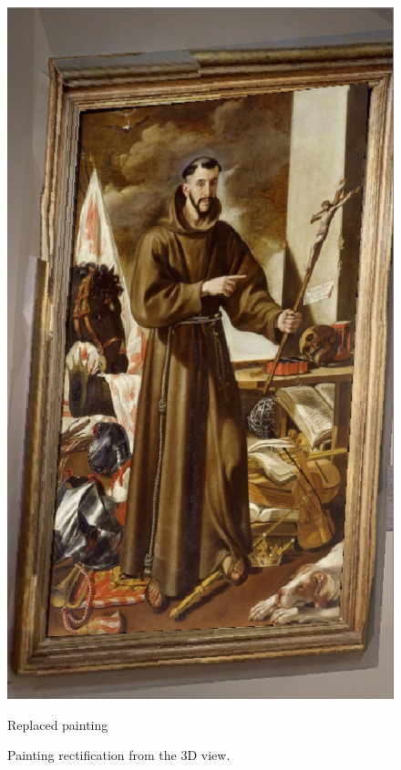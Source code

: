 \begin{figure}[h!]
{{      \includegraphics[width=\linewidth]{pictures/painting_detection/3d_rectification_warped.PNG}
      \caption*{Replaced painting}\label{fig:rectification_warped}
    \endminipage\hfill}}
    \caption{Painting rectification from the 3D view.}\label{fig:3d-warping}
\end{figure}




